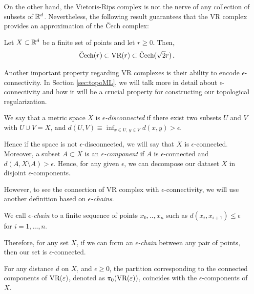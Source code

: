 \documentclass[../main.tex]{subfiles}
\begin{document}
On the other hand, the Vietoris-Rips complex is not the nerve of any collection of subsets of $\RR^d$. Nevertheless, the following result guarantees that the VR complex provides an approximation of the \v{C}ech complex:

\begin{lemma}
\label{fig:lemaVR}
Let $X \subset \RR^d$ be a finite set of points and let $r \geq 0$. Then,
\[
\text{\rm \v{C}ech}(r) \subset \text{\rm VR}(r) \subset \text{\rm \v{C}ech}(\sqrt{2}r)\,.
\]
\end{lemma}

Another important property regarding VR complexes is their ability to encode $\epsilon$-connectivity. In Section \ref{sec:topoML}, we will talk more in detail about $\epsilon$-connectivity and how it will be a crucial property for constructing our topological regularization. 

\begin{definition}
We say that a metric space $X$ is \emph{$\epsilon$-disconnected} if there exist two subsets $U$ and $V$ with $U\cup V = X$, and $d(U,V)\equiv \inf_{x\in U,\, y\in V}d(x,y) > \epsilon$.
\end{definition}
Hence if the space is not $\epsilon$-disconnected, we will say that $X$ is $\epsilon$-connected. Moreover, a subset $A \subset X$ is an \emph{$\epsilon$-component} if $A$ is $\epsilon$-connected and $d(A, {X \setminus A}) > \epsilon$. Hence, for any given $\epsilon$, we can decompose our dataset $X$ in disjoint $\epsilon$-components.

However, to see the connection of VR complex with $\epsilon$-connectivity, we will use another definition based on \emph{$\epsilon$-chains}.

\begin{definition}
We call \emph{$\epsilon$-chain} to a finite sequence of points $x_0, .., x_n$ such as $d(x_i, x_{i+1})\leq \epsilon$ for $i=1,...,n$. 
\end{definition}

Therefore, for any set $X$, if we can form an \emph{$\epsilon$-chain} between any pair of points, then our set is $\epsilon$-connected. 

\begin{proposition}
\label{prop:connected}
For any distance $d$ on $X$, and $\epsilon \geq 0$, the partition corresponding to the connected components of $\text{\rm VR}(\epsilon)$, denoted as $\pi_0(\text{\rm VR}(\epsilon))$, coincides with the $\epsilon$-components of $X$.
\end{proposition}
\end{document}
